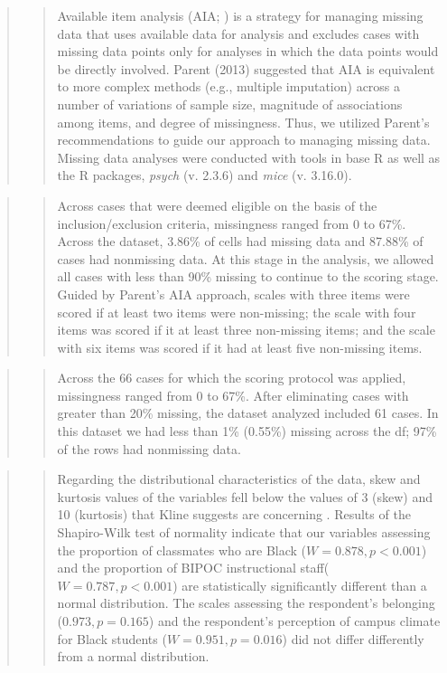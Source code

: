 \documentclass[
  11pt,
]{book}
\begin{document}
\begin{quote}
\begin{quote}
Available item analysis (AIA; \citep{parent_handling_2013}) is a strategy for managing missing data that uses available data for analysis and excludes cases with missing data points only for analyses in which the data points would be directly involved. Parent (2013) suggested that AIA is equivalent to more complex methods (e.g., multiple imputation) across a number of variations of sample size, magnitude of associations among items, and degree of missingness. Thus, we utilized Parent's recommendations to guide our approach to managing missing data. Missing data analyses were conducted with tools in base R as well as the R packages, \emph{psych} (v. 2.3.6) and \emph{mice} (v. 3.16.0).
\end{quote}
\end{quote}

\begin{quote}
\begin{quote}
Across cases that were deemed eligible on the basis of the inclusion/exclusion criteria, missingness ranged from 0 to 67\%. Across the dataset, 3.86\% of cells had missing data and 87.88\% of cases had nonmissing data. At this stage in the analysis, we allowed all cases with less than 90\% missing to continue to the scoring stage. Guided by Parent's \citeyearpar{parent_handling_2013} AIA approach, scales with three items were scored if at least two items were non-missing; the scale with four items was scored if it at least three non-missing items; and the scale with six items was scored if it had at least five non-missing items.
\end{quote}
\end{quote}

\begin{quote}
\begin{quote}
Across the 66 cases for which the scoring protocol was applied, missingness ranged from 0 to 67\%. After eliminating cases with greater than 20\% missing, the dataset analyzed included 61 cases. In this dataset we had less than 1\% (0.55\%) missing across the df; 97\% of the rows had nonmissing data.
\end{quote}
\end{quote}

\begin{quote}
\begin{quote}
Regarding the distributional characteristics of the data, skew and kurtosis values of the variables fell below the values of 3 (skew) and 10 (kurtosis) that Kline suggests are concerning \citeyearpar{kline_principles_2016}. Results of the Shapiro-Wilk test of normality indicate that our variables assessing the proportion of classmates who are Black (\(W = 0.878, p < 0.001\)) and the proportion of BIPOC instructional staff(\(W = 0.787, p < 0.001\)) are statistically significantly different than a normal distribution. The scales assessing the respondent's belonging (\(0.973, p = 0.165\)) and the respondent's perception of campus climate for Black students (\(W = 0.951, p = 0.016\)) did not differ differently from a normal distribution.
\end{quote}
\end{quote}
\end{document}
